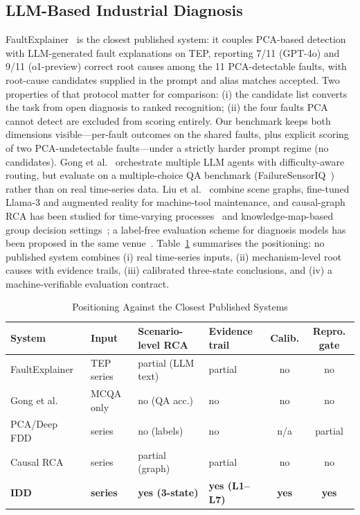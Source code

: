 \documentclass[journal]{IEEEtran}
\begin{document}
\subsection{LLM-Based Industrial Diagnosis}
FaultExplainer~\cite{khan2024faultexplainer} is the closest published system: it couples PCA-based detection with LLM-generated fault explanations on TEP, reporting 7/11 (GPT-4o) and 9/11 (o1-preview) correct root causes among the 11 PCA-detectable faults, with root-cause candidates supplied in the prompt and alias matches accepted. Two properties of that protocol matter for comparison: (i) the candidate list converts the task from open diagnosis to ranked recognition; (ii) the four faults PCA cannot detect are excluded from scoring entirely. Our benchmark keeps both dimensions visible---per-fault outcomes on the shared faults, plus explicit scoring of two PCA-undetectable faults---under a strictly harder prompt regime (no candidates). Gong et al.~\cite{gong2026harnessing} orchestrate multiple LLM agents with difficulty-aware routing, but evaluate on a multiple-choice QA benchmark (FailureSensorIQ~\cite{constantinides2025failuresensoriq}) rather than on real time-series data. Liu et al.~\cite{liu2025probing} combine scene graphs, fine-tuned Llama-3 and augmented reality for machine-tool maintenance, and causal-graph RCA has been studied for time-varying processes~\cite{liu2025spatial} and knowledge-map-based group decision settings~\cite{yue2023root}; a label-free evaluation scheme for diagnosis models has been proposed in the same venue~\cite{liu2024label}. Table~\ref{tab:related} summarises the positioning: no published system combines (i) real time-series inputs, (ii) mechanism-level root causes with evidence trails, (iii) calibrated three-state conclusions, and (iv) a machine-verifiable evaluation contract.

\begin{table}[!t]
\caption{Positioning Against the Closest Published Systems}
\label{tab:related}
\centering
\footnotesize
\begin{tabular}{p{1.9cm}p{1.1cm}p{1.7cm}p{1.2cm}cc}
\toprule
System & Input & Scenario-level RCA & Evidence trail & Calib. & Repro. gate \\
\midrule
FaultExplainer~\cite{khan2024faultexplainer} & TEP series & partial (LLM text) & partial & no & no \\
Gong et al.~\cite{gong2026harnessing} & MCQA only & no (QA acc.) & no & no & no \\
PCA/Deep FDD~\cite{goldenberg2019fault,tuli2022tranad} & series & no (labels) & no & n/a & partial \\
Causal RCA~\cite{liu2025spatial,yue2023root} & series & partial (graph) & partial & no & no \\
\textbf{IDD} & \textbf{series} & \textbf{yes (3-state)} & \textbf{yes (L1--L7)} & \textbf{yes} & \textbf{yes} \\
\bottomrule
\end{tabular}
\end{table}
\end{document}
